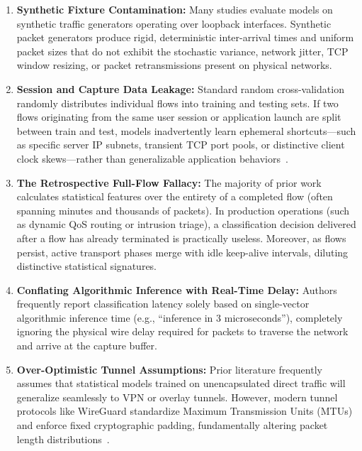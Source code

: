 \documentclass[conference]{IEEEtran}
\begin{document}
\begin{enumerate}
    \item \textbf{Synthetic Fixture Contamination:} Many studies evaluate models on synthetic traffic generators operating over loopback interfaces. Synthetic packet generators produce rigid, deterministic inter-arrival times and uniform packet sizes that do not exhibit the stochastic variance, network jitter, TCP window resizing, or packet retransmissions present on physical networks.
    \item \textbf{Session and Capture Data Leakage:} Standard random cross-validation randomly distributes individual flows into training and testing sets. If two flows originating from the same user session or application launch are split between train and test, models inadvertently learn ephemeral shortcuts---such as specific server IP subnets, transient TCP port pools, or distinctive client clock skews---rather than generalizable application behaviors~\cite{arp2022dos,pendlebury2019tesseract}.
    \item \textbf{The Retrospective Full-Flow Fallacy:} The majority of prior work calculates statistical features over the entirety of a completed flow (often spanning minutes and thousands of packets). In production operations (such as dynamic QoS routing or intrusion triage), a classification decision delivered after a flow has already terminated is practically useless. Moreover, as flows persist, active transport phases merge with idle keep-alive intervals, diluting distinctive statistical signatures.
    \item \textbf{Conflating Algorithmic Inference with Real-Time Delay:} Authors frequently report classification latency solely based on single-vector algorithmic inference time (e.g., ``inference in 3 microseconds''), completely ignoring the physical wire delay required for packets to traverse the network and arrive at the capture buffer.
    \item \textbf{Over-Optimistic Tunnel Assumptions:} Prior literature frequently assumes that statistical models trained on unencapsulated direct traffic will generalize seamlessly to VPN or overlay tunnels. However, modern tunnel protocols like WireGuard standardize Maximum Transmission Units (MTUs) and enforce fixed cryptographic padding, fundamentally altering packet length distributions~\cite{donenfeld2017wireguard}.
\end{enumerate}
\end{document}
